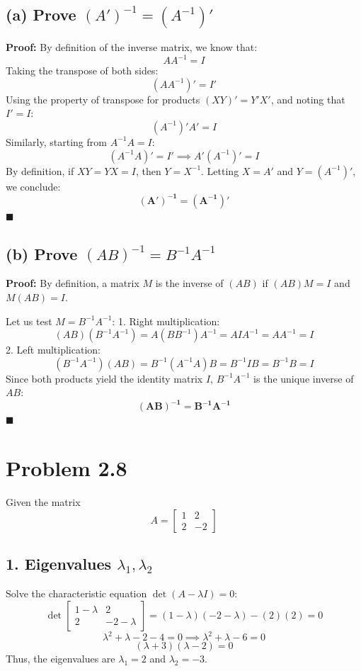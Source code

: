 \documentclass[11pt]{article}
\begin{document}
\subsection*{(a) Prove $(A')^{-1} = (A^{-1})'$}
\textbf{Proof:}
By definition of the inverse matrix, we know that:
\[
A A^{-1} = I
\]
Taking the transpose of both sides:
\[
(A A^{-1})' = I'
\]
Using the property of transpose for products $(XY)' = Y'X'$, and noting that $I' = I$:
\[
(A^{-1})' A' = I
\]
Similarly, starting from $A^{-1}A = I$:
\[
(A^{-1}A)' = I' \implies A' (A^{-1})' = I
\]
By definition, if $X Y = Y X = I$, then $Y = X^{-1}$. Letting $X = A'$ and $Y = (A^{-1})'$, we conclude:
\[
\mathbf{(A')^{-1} = (A^{-1})'}
\]
\hfill $\blacksquare$

\subsection*{(b) Prove $(AB)^{-1} = B^{-1}A^{-1}$}
\textbf{Proof:}
By definition, a matrix $M$ is the inverse of $(AB)$ if $(AB)M = I$ and $M(AB) = I$. 

Let us test $M = B^{-1}A^{-1}$:
1. Right multiplication:
\[
(AB)(B^{-1}A^{-1}) = A(B B^{-1})A^{-1} = A I A^{-1} = A A^{-1} = I
\]
2. Left multiplication:
\[
(B^{-1}A^{-1})(AB) = B^{-1}(A^{-1}A)B = B^{-1} I B = B^{-1}B = I
\]
Since both products yield the identity matrix $I$, $B^{-1}A^{-1}$ is the unique inverse of $AB$:
\[
\mathbf{(AB)^{-1} = B^{-1}A^{-1}}
\]
\hfill $\blacksquare$

\section*{Problem 2.8}
Given the matrix
\[
A = \begin{bmatrix} 1 & 2 \\ 2 & -2 \end{bmatrix}
\]

\subsection*{1. Eigenvalues $\lambda_1, \lambda_2$}
Solve the characteristic equation $\det(A - \lambda I) = 0$:
\[
\det \begin{bmatrix} 1-\lambda & 2 \\ 2 & -2-\lambda \end{bmatrix} = (1-\lambda)(-2-\lambda) - (2)(2) = 0
\]
\[
\lambda^2 + \lambda - 2 - 4 = 0 \implies \lambda^2 + \lambda - 6 = 0
\]
\[
(\lambda + 3)(\lambda - 2) = 0
\]
Thus, the eigenvalues are \textbf{$\lambda_1 = 2$} and \textbf{$\lambda_2 = -3$}.
\end{document}

